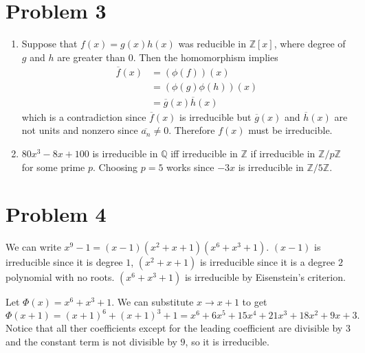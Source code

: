 \documentclass{article}
\begin{document}
\section*{Problem 3}
\begin{enumerate}
    \item Suppose that $f(x) = g(x)h(x)$ was reducible in $\mathbb{Z}[x]$, where degree of $g$ and $h$ are greater than $0$. 
    Then the homomorphism implies 
    \begin{align*}
        \overline{f}(x) &= (\phi(f))(x) \\
        &=(\phi(g)\phi(h))(x) \\
        &= \overline{g}(x)\overline{h}(x)
    \end{align*}
    which is a contradiction since $\overline{f}(x)$ is irreducible but $\overline{g}(x)$ and $\overline{h}(x)$
    are not units and nonzero since $\overline{a_n} \neq 0$.
    Therefore $f(x)$ must be irreducible.
    \item $80x^3-8x+100$ is irreducible in $\mathbb{Q}$ iff irreducible in $\mathbb{Z}$ if irreducible in $\mathbb{Z}/p\mathbb{Z}$ for some prime $p$.
    Choosing $p=5$ works since $-3x$ is irreducible in $\mathbb{Z}/5\mathbb{Z}$.
\end{enumerate}
\newpage
\section*{Problem 4}
    We can write $x^9-1 = (x-1)(x^2+x+1)(x^6+x^3+1)$.
    $(x-1)$ is irreducible since it is degree $1$,
    $(x^2+x+1)$ is irreducible since it is a degree $2$ polynomial with no roots.
    $(x^6+x^3+1)$ is irreducible by Eisenstein's criterion. 
    
    Let $\Phi(x) = x^6+x^3+1$.
    We can substitute $x \to x+1$ to get 
    \[
        \Phi(x+1) = (x+1)^6 + (x+1)^3 + 1 = 
        x^6 + 6x^5 + 15x^4 + 21x^3 + 18x^2 + 9x + 3.
    \]
    Notice that all ther coefficients except for the leading coefficient 
    are divisible by $3$ and the constant term is not divisible by $9$,
    so it is irreducible.
    \newpage
\end{document}
